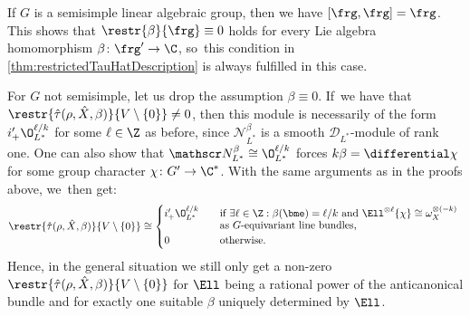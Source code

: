 \begin{rmk}
If $G$ is a semisimple linear algebraic group, then we have $[\frg, \frg] = \frg$. This shows that $\restr{\beta}{\frg} \equiv 0$ holds for every Lie algebra homomorphism $\beta \colon \frg' \to \C$, so~this condition in \cref{thm:restrictedTauHatDescription} is always fulfilled in this case.
\end{rmk}

\begin{rmk}
For $G$ not semisimple, let us drop the assumption $\beta \equiv 0$. If~we have that $\restr{\hat{\tau}(\rho,\hat X, \beta)}{V \setminus \{0\}} \neq 0$,
then this module is necessarily of the form $i'_+\O_{L^*}^{\ell/k}$ for some $\ell \in \Z$ as before, since $\mathscr N_{L^*}^\beta$ is a smooth $\mathscr D_{L^*}$\nobreakdash-mod\-ule of rank one.
One can also show that $\mathscr N_{L^*}^\beta \cong \O_{L^*}^{\ell/k}$ forces $k\beta = \differential \chi$ for some group character $\chi \colon G' \to \C^*$.
With the same arguments as in the proofs above, we~then get:
\[
\restr{\hat{\tau}(\rho, \hat{X}, \beta)}{V \setminus \{0\}} \cong
\begin{cases}
i'_+ \O_{L^*}^{\ell/k} & \quad\text{if $\exists \ell \in \Z: \beta(\bme) = \ell/k$ and $\Ell^{\otimes \ell}\{\chi\} \cong \omega_X^{\otimes (-k)}$ } \\[-3pt]
& \quad\text{as $G$-equivariant line bundles,} \\
0 & \quad\text{otherwise.}
\end{cases}
\]
Hence, in the general situation we still only get a non-zero $\restr{\hat\tau(\rho, \hat X, \beta)}{V \setminus \{0\}}$ for $\Ell$ being a rational power of the anticanonical bundle and for exactly one suitable $\beta$ uniquely determined by $\Ell$.
\end{rmk}

